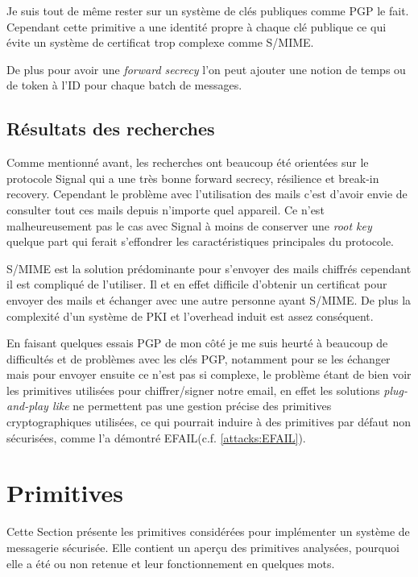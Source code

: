 Je suis tout de même rester sur un système de clés publiques comme PGP le fait. Cependant cette primitive a une identité propre à chaque clé publique ce qui évite un système de certificat trop complexe comme S/MIME.

De plus pour avoir une \textit{forward secrecy} l'on peut ajouter une notion de temps ou de token à l'ID pour chaque batch de messages.
\subsection{Résultats des recherches}
Comme mentionné avant, les recherches ont beaucoup été orientées sur le protocole Signal qui a une très bonne forward secrecy, résilience et break-in recovery. Cependant le problème avec l'utilisation des mails c'est d'avoir envie de consulter tout ces mails depuis n'importe quel appareil. Ce n'est malheureusement pas le cas avec Signal à moins de conserver une \textit{root key} quelque part qui ferait s'effondrer les caractéristiques principales du protocole.

S/MIME est la solution prédominante pour s'envoyer des mails chiffrés cependant il est compliqué de l'utiliser. Il et en effet difficile d'obtenir un certificat pour envoyer des mails et échanger avec une autre personne ayant S/MIME. De plus la complexité d'un système de PKI et l'overhead induit est assez conséquent.

En faisant quelques essais PGP de mon côté je me suis heurté à beaucoup de difficultés et de problèmes avec les clés PGP, notamment pour se les échanger mais pour envoyer ensuite ce n'est pas si complexe, le problème étant de bien voir les primitives utilisées pour chiffrer/signer notre email, en effet les solutions \textit{plug-and-play like} ne permettent pas une gestion précise des primitives cryptographiques utilisées, ce qui pourrait induire à des primitives par défaut non sécurisées, comme l'a démontré EFAIL(c.f. \ref{attacks:EFAIL}).
\section{Primitives}
Cette Section présente les primitives considérées pour implémenter un système de messagerie sécurisée. Elle contient un aperçu des primitives analysées, pourquoi elle a été ou non retenue et leur fonctionnement en quelques mots.
